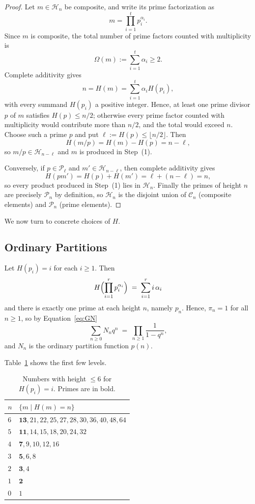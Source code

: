 \documentclass[11pt]{article}
\theoremstyle{definition}
\begin{document}
\begin{proof}
Let $m\in\mathcal{H}_n$ be composite, and write its prime factorization as
\[
  m=\prod_{i=1}^t p_i^{\alpha_i}.
\]
Since $m$ is composite, the total number of prime factors counted with
multiplicity is
\[
  \Omega(m):=\sum_{i=1}^t\alpha_i\ge2.
\]
Complete additivity gives
\[
  n=H(m)=\sum_{i=1}^t \alpha_iH(p_i),
\]
with every summand $H(p_i)$ a positive integer.  Hence, at least one prime
divisor $p$ of $m$ satisfies $H(p)\le n/2$; otherwise every prime factor counted
with multiplicity would contribute more than $n/2$, and the total would exceed
$n$.  Choose such a prime $p$ and put
$\ell:=H(p)\le \lfloor n/2\rfloor$.  Then
\[
  H(m/p)=H(m)-H(p)=n-\ell,
\]
so $m/p\in\mathcal{H}_{n-\ell}$ and $m$ is produced in Step~(1).

Conversely, if $p\in\mathcal{P}_\ell$ and $m'\in\mathcal{H}_{n-\ell}$,
then complete additivity gives
\[
  H(pm') = H(p)+H(m') = \ell + (n-\ell) = n,
\]
so every product produced in Step~(1) lies in $\mathcal{H}_n$.  Finally
the primes of height $n$ are precisely $\mathcal{P}_n$ by definition,
so $\mathcal{H}_n$ is the disjoint union of $\mathcal{C}_n$ (composite
elements) and $\mathcal{P}_n$ (prime elements).
\end{proof}

We now turn to concrete choices of $H$.

\subsection{Ordinary Partitions}
\label{ex:H=i}

Let $H(p_i)=i$ for each $i\ge1$.  Then
\[
  H\Bigl(\prod_{i=1}^r p_i^{\alpha_i}\Bigr)
  \;=\; \sum_{i=1}^r i\,\alpha_i
\]
and there is exactly one prime at each height $n$, namely $p_n$.
Hence, $\pi_n=1$ for all $n\ge1$, so by Equation~\eqref{eq:GN}
\[
  \sum_{n\ge0} N_n q^n
  \;=\;
  \prod_{n\ge1} \frac{1}{1-q^n},
\]
and $N_n$ is the ordinary partition function $p(n)$.

Table~\ref{tab:H=i} shows the first few levels.

\begin{table}[ht]
\centering
\begin{tabular}{| l | l | }
\hline\hline
$n$ & $\{m\mid H(m)=n\}$\\
\hline
$6$ & $\mathbf{13}, 21, 22, 25, 27, 28, 30, 36, 40, 48, 64$ \\
$5$ & $\mathbf{11}, 14, 15, 18, 20, 24, 32$ \\
$4$ & $\mathbf{7}, 9, 10, 12, 16$ \\
$3$ & $\mathbf{5}, 6, 8$ \\
$2$ & $\mathbf{3}, 4$ \\
$1$ & $\mathbf{2}$ \\
$0$ & $1$ \\
\hline
\end{tabular}
\caption{Numbers with height $\le 6$ for $H(p_i)=i$. Primes are in bold.}
\label{tab:H=i}
\end{table} 
\end{document}
